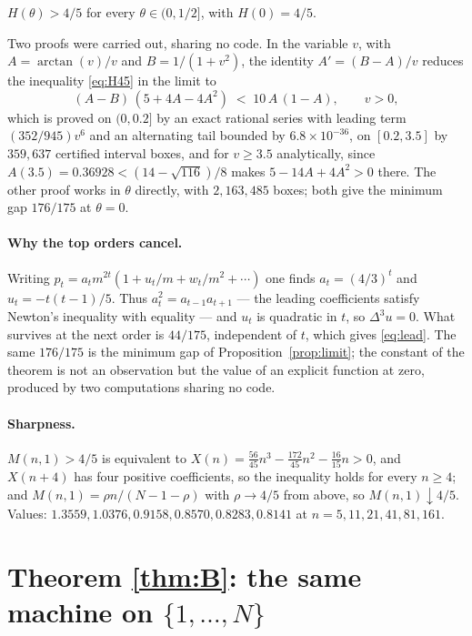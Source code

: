 \documentclass[12pt]{article}
\begin{document}
\begin{proposition}\label{prop:limit}
$H(\theta) > 4/5$ for every $\theta\in(0,1/2]$, with $H(0) = 4/5$.
\end{proposition}

Two proofs were carried out, sharing no code. In the variable $v$, with $A = \arctan(v)/v$ and $B = 1/(1+v^2)$, the identity $A' = (B-A)/v$ reduces the inequality \eqref{eq:H45} in the limit to
\begin{equation}\label{eq:AB}
(A-B)\,(5+4A-4A^2) \;<\; 10\,A\,(1-A), \qquad v>0,
\end{equation}
which is proved on $(0,0.2]$ by an exact rational series with leading term $(352/945)v^6$ and an alternating tail bounded by $6.8\times10^{-36}$, on $[0.2,3.5]$ by $359{,}637$ certified interval boxes, and for $v\ge3.5$ analytically, since $A(3.5) = 0.36928 < (14-\sqrt{116})/8$ makes $5-14A+4A^2>0$ there. The other proof works in $\theta$ directly, with $2{,}163{,}485$ boxes; both give the minimum gap $176/175$ at $\theta=0$.

\paragraph{Why the top orders cancel.}
Writing $p_t = a_t m^{2t}(1 + u_t/m + w_t/m^2 + \cdots)$ one finds $a_t = (4/3)^t$ and $u_t = -t(t-1)/5$. Thus $a_t^2 = a_{t-1}a_{t+1}$ --- the leading coefficients satisfy Newton's inequality with equality --- and $u_t$ is quadratic in $t$, so $\Delta^3 u = 0$. What survives at the next order is $44/175$, independent of $t$, which gives \eqref{eq:lead}. The same $176/175$ is the minimum gap of Proposition~\ref{prop:limit}; the constant of the theorem is not an observation but the value of an explicit function at zero, produced by two computations sharing no code.

\paragraph{Sharpness.}
$M(n,1) > 4/5$ is equivalent to $X(n) = \tfrac{56}{45}n^3 - \tfrac{172}{45}n^2 - \tfrac{16}{15}n > 0$, and $X(n+4)$ has four positive coefficients, so the inequality holds for every $n\ge4$; and $M(n,1) = \rho n/(N-1-\rho)$ with $\rho\to4/5$ from above, so $M(n,1)\downarrow 4/5$. Values: $1.3559, 1.0376, 0.9158, 0.8570, 0.8283, 0.8141$ at $n = 5, 11, 21, 41, 81, 161$.

\section{Theorem \ref{thm:B}: the same machine on $\{1,\dots,N\}$}\label{sec:B}
\end{document}

